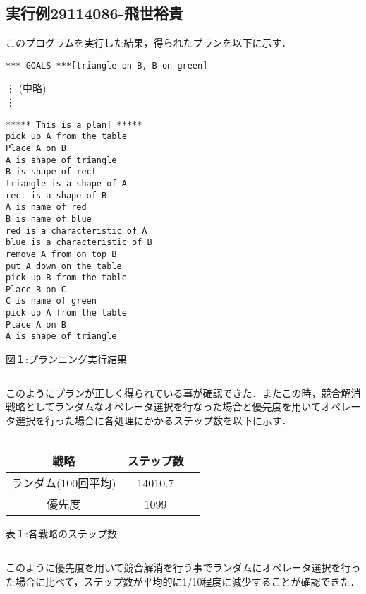 \documentclass{jarticle}
\begin{document}
\subsection{実行例29114086-飛世裕貴}
このプログラムを実行した結果，得られたプランを以下に示す．
\begin{screen}
\begin{verbatim}
*** GOALS ***[triangle on B, B on green]
\end{verbatim}
\vdots
(中略)\\
\vdots
\begin{verbatim}
***** This is a plan! *****
pick up A from the table
Place A on B
A is shape of triangle
B is shape of rect
triangle is a shape of A
rect is a shape of B
A is name of red
B is name of blue
red is a characteristic of A
blue is a characteristic of B
remove A from on top B
put A down on the table
pick up B from the table
Place B on C
C is name of green
pick up A from the table
Place A on B
A is shape of triangle
\end{verbatim}
\end{screen}
\begin{center}
図１:プランニング実行結果
\end{center}
\begin{verbatim}

\end{verbatim}
このようにプランが正しく得られている事が確認できた．またこの時，競合解消戦略としてランダムなオペレータ選択を行なった場合と優先度を用いてオペレータ選択を行った場合に各処理にかかるステップ数を以下に示す．
\begin{verbatim}

\end{verbatim}
\begin{center}
\begin{tabular}{|c|c|c|}
  \hline
  戦略&ステップ数\\
  \hline
  ランダム(100回平均)&14010.7\\
  \hline
  優先度&1099\\
  \hline
\end{tabular}
\end{center}
\begin{center}
表１:各戦略のステップ数
\end{center}
\begin{verbatim}

\end{verbatim}
このように優先度を用いて競合解消を行う事でランダムにオペレータ選択を行った場合に比べて，ステップ数が平均的に1/10程度に減少することが確認できた．
\end{document}
